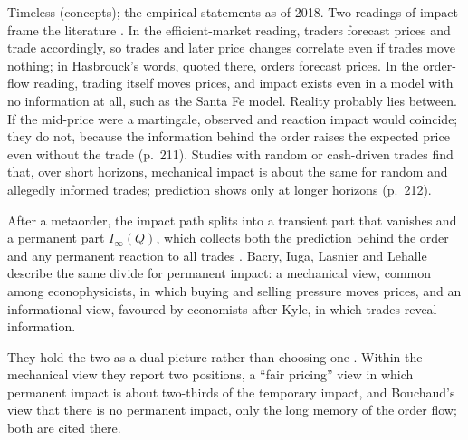 \begin{qfdefinition}
 Timeless (concepts); the empirical statements as of 2018. Two readings of impact frame the literature \citep[chap.~11, sec.~11.1, pp.~208--210]{catalogue-0528}. In the efficient-market reading, traders forecast prices and trade accordingly, so trades and later price changes correlate even if trades move nothing; in Hasbrouck's words, quoted there, orders forecast prices. In the order-flow reading, trading itself moves prices, and impact exists even in a model with no information at all, such as the Santa Fe model. Reality probably lies between. If the mid-price were a martingale, observed and reaction impact would coincide; they do not, because the information behind the order raises the expected price even without the trade (p.~211). Studies with random or cash-driven trades find that, over short horizons, mechanical impact is about the same for random and allegedly informed trades; prediction shows only at longer horizons (p.~212).

After a metaorder, the impact path splits into a transient part that vanishes and a permanent part $I_\infty(Q)$, which collects both the prediction behind the order and any permanent reaction to all trades \citep[chap.~12, sec.~12.2, eq.~(12.5), p.~233]{catalogue-0528}. Bacry, Iuga, Lasnier and Lehalle describe the same divide for permanent impact: a mechanical view, common among econophysicists, in which buying and selling pressure moves prices, and an informational view, favoured by economists after Kyle, in which trades reveal information.

They hold the two as a dual picture rather than choosing one \citep[arXiv preprint of 9 Dec.\ 2014, sec.~7.1, pp.~19--20]{wide-bacry-life-cycle}. Within the mechanical view they report two positions, a ``fair pricing'' view in which permanent impact is about two-thirds of the temporary impact, and Bouchaud's view that there is no permanent impact, only the long memory of the order flow; both are cited there.


\end{qfdefinition}
